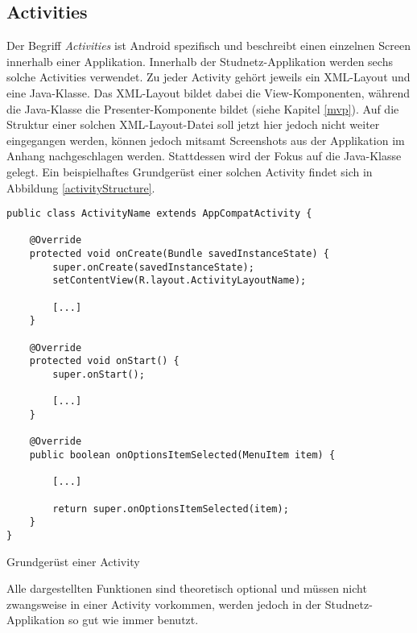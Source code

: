 \documentclass[../main.tex]{subfiles}
\begin{document}
	\subsection{Activities} \label{activities}
	Der Begriff \emph{Activities} ist Android spezifisch und beschreibt einen einzelnen Screen innerhalb einer Applikation. Innerhalb der Studnetz-Applikation werden sechs solche Activities verwendet. Zu jeder Activity gehört jeweils ein XML-Layout und eine Java-Klasse. Das XML-Layout bildet dabei die View-Komponenten, während die Java-Klasse die Presenter-Komponente bildet (siehe Kapitel \ref{mvp}). Auf die Struktur einer solchen XML-Layout-Datei soll jetzt hier jedoch nicht weiter eingegangen werden, können jedoch mitsamt Screenshots aus der Applikation im Anhang nachgeschlagen werden. Stattdessen wird der Fokus auf die Java-Klasse gelegt. Ein beispielhaftes Grundgerüst einer solchen Activity findet sich in Abbildung \ref{activityStructure}.
	
\begin{code}
	\begin{center}
		\begin{verbatim}
public class ActivityName extends AppCompatActivity {
			
	@Override
	protected void onCreate(Bundle savedInstanceState) {
		super.onCreate(savedInstanceState);
		setContentView(R.layout.ActivityLayoutName);
		
		[...]	
	}
	
	@Override
	protected void onStart() {
		super.onStart();
		
		[...]
	}
	
	@Override
	public boolean onOptionsItemSelected(MenuItem item) {
		
		[...]
		
		return super.onOptionsItemSelected(item);
	}
}	
		\end{verbatim}
		\caption{Grundgerüst einer Activity}
		\label{activityStructure}
	\end{center}
	
\end{code}

	Alle dargestellten Funktionen sind theoretisch optional und müssen nicht zwangsweise in einer Activity vorkommen, werden jedoch in der Studnetz-Applikation so gut wie immer benutzt.
\end{document}
